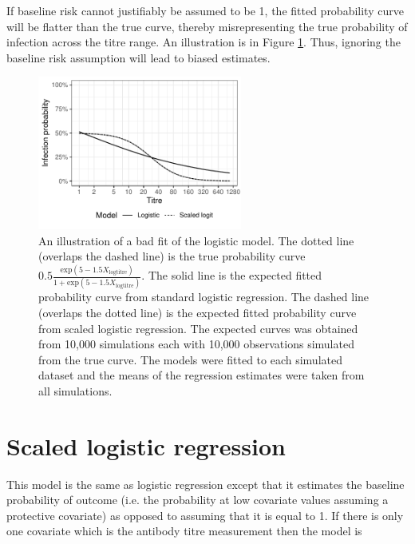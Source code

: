 \documentclass[12pt]{article}
\begin{document}
If baseline risk cannot justifiably be assumed to be 1, the fitted probability curve will be flatter than the true curve, thereby misrepresenting the true probability of infection across the titre range. An illustration is in Figure \ref{LogisticFit}. Thus, ignoring the baseline risk assumption will lead to biased estimates.



\begin{figure}[htp]
	\centering
	\includegraphics[width=0.6\textwidth]{../logistic-plot/lrex.pdf}
	\caption{
	An illustration of a bad fit of the logistic model. The dotted line (overlaps the dashed line) is the true probability curve $0.5\frac{\text{exp}(5 - 1.5 X_{\text{logtitre}})}{1 + \text{exp}(5 - 1.5 X_{\text{logtitre}})}$. The solid line is the expected fitted probability curve from standard logistic regression. The dashed line (overlaps the dotted line) is the expected fitted probability curve from scaled logistic regression. The expected curves was obtained from 10,000 simulations each with 10,000 observations simulated from the true curve. The models were fitted to each simulated dataset and the means of the regression estimates were taken from all simulations.
	}
	\label{LogisticFit}
\end{figure}


\section{Scaled logistic regression}

This model is the same as logistic regression except that it estimates the baseline probability of outcome (i.e. the probability at low covariate values assuming a protective covariate) as opposed to assuming that it is equal to 1. If there is only one covariate which is the antibody titre measurement then the model is
\end{document}
